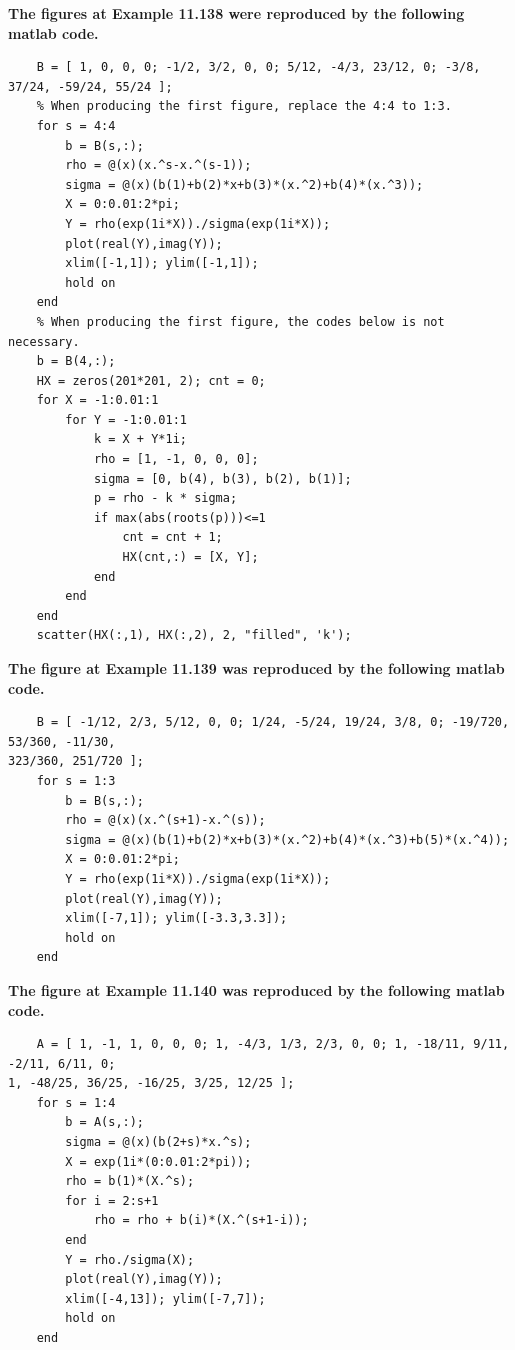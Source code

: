 \documentclass[twoside,a4paper]{article}
\begin{document}
\textbf{The figures at Example 11.138 were reproduced by the following matlab code.}
\begin{lstlisting}
    B = [ 1, 0, 0, 0; -1/2, 3/2, 0, 0; 5/12, -4/3, 23/12, 0; -3/8, 37/24, -59/24, 55/24 ];
    % When producing the first figure, replace the 4:4 to 1:3.
    for s = 4:4
        b = B(s,:);
        rho = @(x)(x.^s-x.^(s-1));
        sigma = @(x)(b(1)+b(2)*x+b(3)*(x.^2)+b(4)*(x.^3));
        X = 0:0.01:2*pi;
        Y = rho(exp(1i*X))./sigma(exp(1i*X));
        plot(real(Y),imag(Y));
        xlim([-1,1]); ylim([-1,1]);
        hold on
    end
    % When producing the first figure, the codes below is not necessary.
    b = B(4,:);
    HX = zeros(201*201, 2); cnt = 0;
    for X = -1:0.01:1
        for Y = -1:0.01:1
            k = X + Y*1i;
            rho = [1, -1, 0, 0, 0];
            sigma = [0, b(4), b(3), b(2), b(1)];
            p = rho - k * sigma;
            if max(abs(roots(p)))<=1
                cnt = cnt + 1;
                HX(cnt,:) = [X, Y];
            end
        end
    end
    scatter(HX(:,1), HX(:,2), 2, "filled", 'k');
\end{lstlisting}

\textbf{The figure at Example 11.139 was reproduced by the following matlab code.}
\begin{lstlisting}
    B = [ -1/12, 2/3, 5/12, 0, 0; 1/24, -5/24, 19/24, 3/8, 0; -19/720, 53/360, -11/30, 
323/360, 251/720 ];
    for s = 1:3
        b = B(s,:);
        rho = @(x)(x.^(s+1)-x.^(s));
        sigma = @(x)(b(1)+b(2)*x+b(3)*(x.^2)+b(4)*(x.^3)+b(5)*(x.^4));
        X = 0:0.01:2*pi;
        Y = rho(exp(1i*X))./sigma(exp(1i*X));
        plot(real(Y),imag(Y));
        xlim([-7,1]); ylim([-3.3,3.3]);
        hold on
    end
\end{lstlisting}

\textbf{The figure at Example 11.140 was reproduced by the following matlab code.}
\begin{lstlisting}
    A = [ 1, -1, 1, 0, 0, 0; 1, -4/3, 1/3, 2/3, 0, 0; 1, -18/11, 9/11, -2/11, 6/11, 0; 
1, -48/25, 36/25, -16/25, 3/25, 12/25 ];
    for s = 1:4
        b = A(s,:);
        sigma = @(x)(b(2+s)*x.^s);
        X = exp(1i*(0:0.01:2*pi));
        rho = b(1)*(X.^s);
        for i = 2:s+1
            rho = rho + b(i)*(X.^(s+1-i));
        end
        Y = rho./sigma(X);
        plot(real(Y),imag(Y));
        xlim([-4,13]); ylim([-7,7]);
        hold on
    end
\end{lstlisting}
\end{document}
